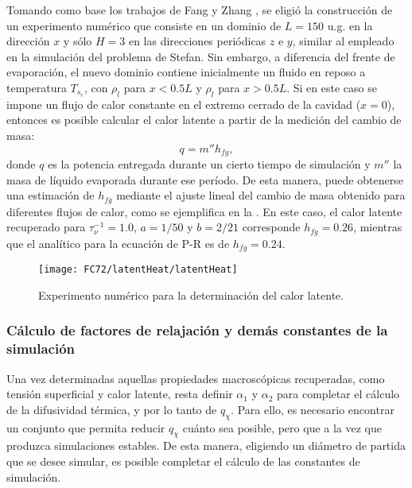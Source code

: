 Tomando como base los trabajos de Fang \cite{fang_lattice_2017} y Zhang \cite{zhang_simulation_2015}, se eligi\'o la construcci\'on de un experimento num\'erico que consiste en un dominio de $L=150$ u.g. en la direcci\'on $x$ y s\'olo $H=3$ en las direcciones peri\'odicas $z$ e $y$, similar al empleado en la simulaci\'on del problema de Stefan. Sin embargo, a diferencia del frente de evaporaci\'on, el nuevo dominio contiene inicialmente un fluido en reposo a temperatura $T_{s_r}$, con $\rho_l$ para $x<0.5L$ y $\rho_l$ para $x>0.5L$. Si en este caso se impone un flujo de calor constante en el extremo cerrado de la cavidad ($x=0$), entonces es posible calcular el calor latente a partir de la medici\'on del cambio de masa:
\begin{equation}
	q = m'' h_{fg},
\end{equation}
donde $q$ es la potencia entregada durante un cierto tiempo de simulaci\'on y $m''$ la masa de l\'iquido evaporada durante ese per\'iodo. De esta manera, puede obtenerse una estimaci\'on de $h_{fg}$ mediante el ajuste lineal del cambio de masa obtenido para diferentes flujos de calor, como se ejemplifica en la . En este caso, el calor latente recuperado para $\tau_{\nu}^{-1}=1.0$, $a=1/50$ y $b=2/21$ corresponde $h_{fg}=0.26$, mientras que el anal\'itico para la ecuaci\'on de P-R \cite{peng_new_1976} es de $h_{fg}=0.24$.

\begin{figure}[ht]
	\centering
	\texttt{[image: FC72/latentHeat/latentHeat]}
	\caption{Experimento num\'erico para la determinaci\'on del calor latente. }
	\label{fig:calor_latente_3D}
\end{figure}


\subsubsection{C\'alculo de factores de relajaci\'on y dem\'as constantes de la simulaci\'on}

Una vez determinadas aquellas propiedades macrosc\'opicas recuperadas, como tensi\'on superficial y calor latente, resta definir $\alpha_1$ y $\alpha_2$ para completar el c\'alculo de la difusividad t\'ermica, y por lo tanto de $q_{\chi}$. Para ello, es necesario encontrar un conjunto que permita reducir $q_{\chi}$ cu\'anto sea posible, pero que a la vez que produzca simulaciones estables. De esta manera, eligiendo un di\'ametro de partida que se desee simular, es posible completar el c\'alculo de las constantes de simulaci\'on. 


